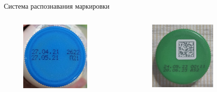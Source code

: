 \documentclass[10pt]{beamer}
\begin{document}
\begin{frame}{Система распознавания маркировки}
            \begin{columns}
                \begin{column}{0.4\textwidth}
                    \begin{figure}[H]
                        \centering
                        \includegraphics[width=0.8\textwidth]{pic4-1.jpg}
                    \end{figure}
                \end{column}
                \begin{column}{0.4\textwidth}
                    \begin{figure}[H]
                        \centering
                        \includegraphics[width=0.8\textwidth]{cap_new.jpg}
                    \end{figure}
                \end{column}
            \end{columns}
        \end{frame}
\end{document}
